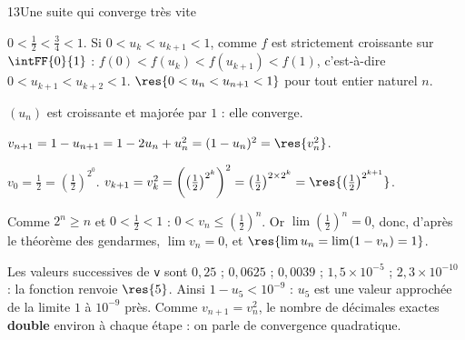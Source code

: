 \begin{corrige}{13}{Une suite qui converge très vite}
\begin{questions}[start=4]
  \item {} $0<\frac12<\frac34<1$.\enspace
     Si $0<u_k<u_{k+1}<1$, comme $f$ est strictement croissante sur $\intFF{0}{1}$ :
    $f(0)<f(u_k)<f(u_{k+1})<f(1)$, c'est-à-dire $0<u_{k+1}<u_{k+2}<1$.\enspace
     $\res{0<u_n<u_{n+1}<1}$ pour tout entier naturel $n$.
  \item $(u_n)$ est croissante et majorée par $1$ : elle converge.
\end{questions}
\begin{questions}[start=6]
  \item $v_{n+1}=1-u_{n+1}=1-2u_n+u_n^{2}=(1-u_n)^{2}=\res{v_n^{2}}$.
  \item {} $v_0=\frac12=\left(\frac12\right)^{2^{0}}$.\enspace
     $v_{k+1}=v_k^{2}=\left(\left(\frac12\right)^{2^{k}}\right)^{2}=\left(\frac12\right)^{2\times2^{k}}=\res{\left(\frac12\right)^{2^{k+1}}}$.
  \item Comme $2^{n}\geq n$ et $0<\frac12<1$ : $0<v_n\leq\left(\frac12\right)^{n}$. Or $\lim\left(\frac12\right)^{n}=0$, donc,
    d'après le théorème des gendarmes, $\lim v_n=0$, et $\res{\lim u_n=\lim(1-v_n)=1}$.
  \item Les valeurs successives de \lstinline[style=otPython]!v! sont $0{,}25$ ; $0{,}0625$ ; $0{,}0039$ ;
    $1{,}5\times10^{-5}$ ; $2{,}3\times10^{-10}$ : la fonction renvoie $\res{5}$. Ainsi $1-u_5<10^{-9}$ : $u_5$ est une
    valeur approchée de la limite $1$ à $10^{-9}$ près. Comme $v_{n+1}=v_n^{2}$, le nombre de décimales exactes
    \textbf{double} environ à chaque étape : on parle de convergence quadratique.
\end{questions}
\end{corrige}

